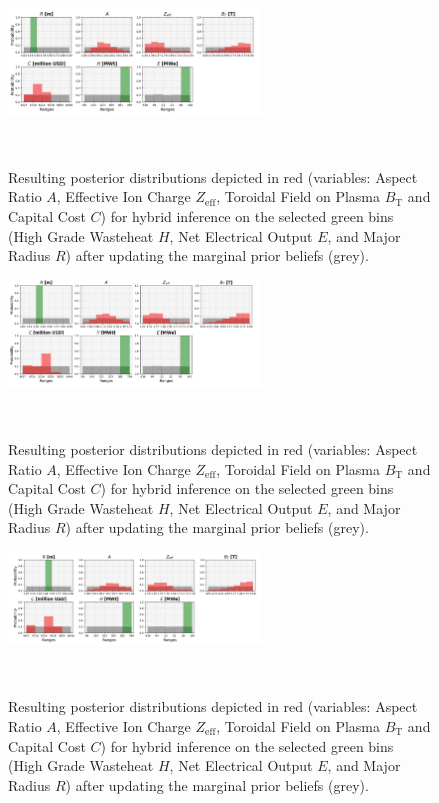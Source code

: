 \begin{figure}[!b]
    \centering
    \includegraphics[width=0.6\textwidth]{figures/TE_results/march_data/config(57)_outputs(3)_hybrid_3.png}
    \caption{Resulting posterior distributions depicted in red (variables: Aspect Ratio $A$, Effective Ion Charge $Z_{\text{eff}}$, Toroidal Field on Plasma $B_{\text{T}}$ and Capital Cost $C$) for hybrid inference on the selected green bins (High Grade Wasteheat $H$, Net Electrical Output $E$, and Major Radius $R$) after updating the marginal prior beliefs (grey).}~\label{fig:config(57)_outputs(3)_hybrid_3}
\end{figure}

\begin{figure}[!b]
    \centering
    \includegraphics[width=0.6\textwidth]{figures/TE_results/march_data/config(57)_outputs(3)_hybrid4.png}
    \caption{Resulting posterior distributions depicted in red (variables: Aspect Ratio $A$, Effective Ion Charge $Z_{\text{eff}}$, Toroidal Field on Plasma $B_{\text{T}}$ and Capital Cost $C$) for hybrid inference on the selected green bins (High Grade Wasteheat $H$, Net Electrical Output $E$, and Major Radius $R$) after updating the marginal prior beliefs (grey).}~\label{fig:config(57)_outputs(3)_hybrid4}
\end{figure}

\begin{figure}[!b]
    \centering
    \includegraphics[width=0.6\textwidth]{figures/TE_results/march_data/config(57)_outputs(3)_hybrid5.png}
    \caption{Resulting posterior distributions depicted in red (variables: Aspect Ratio $A$, Effective Ion Charge $Z_{\text{eff}}$, Toroidal Field on Plasma $B_{\text{T}}$ and Capital Cost $C$) for hybrid inference on the selected green bins (High Grade Wasteheat $H$, Net Electrical Output $E$, and Major Radius $R$) after updating the marginal prior beliefs (grey).}~\label{fig:config(57)_outputs(3)_hybrid5}
\end{figure}


